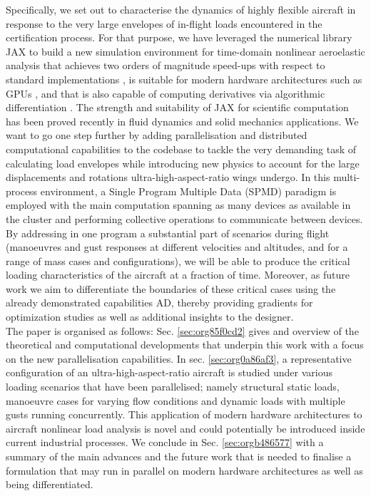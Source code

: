 \documentclass[11pt]{article}
\begin{document}
Specifically, we set out to characterise the dynamics of highly flexible aircraft in response to the very large envelopes of in-flight loads encountered in the certification process. 
For that purpose, we have leveraged the numerical library JAX \cite{jax2018github} to build a new simulation environment for time-domain nonlinear aeroelastic analysis that achieves two orders of magnitude speed-ups with respect to standard implementations \cite{CEA2024},  is suitable for modern hardware architectures such as GPUs \cite{ALVAROCEA2024}, and that is also capable of computing derivatives via algorithmic differentiation \cite{ALVAROCEA2024a}. The strength and suitability of JAX for scientific computation has been proved recently in fluid dynamics \cite{BEZGIN2023} and solid mechanics \cite{XUE2023} applications. 
We want to go one step further by adding parallelisation and distributed computational capabilities to the codebase to tackle the very demanding task of calculating load envelopes while introducing new physics to account for the large displacements and rotations ultra-high-aspect-ratio wings undergo. 
In this multi-process environment, a Single Program Multiple Data (SPMD) paradigm is employed with the main computation spanning as many devices as available in the cluster and performing collective operations to communicate between devices. 
By addressing in one program a substantial part of scenarios during flight (manoeuvres and gust responses at different velocities and altitudes, and for a range of mass cases and configurations), we will be able to produce the critical loading characteristics of the aircraft at a fraction of time. Moreover, as future work we aim to differentiate the boundaries of these critical cases  using the already demonstrated capabilities AD, thereby providing gradients for optimization studies as well as additional insights to the designer.  
\\[0pt]
The paper is organised as follows: Sec. \ref{sec:org85f0cd2} gives and overview of the theoretical and computational developments that underpin this work with a focus on the new parallelisation capabilities. In sec. \ref{sec:org0a86af3}, a representative configuration of an ultra-high-aspect-ratio aircraft is studied under various loading scenarios that have been parallelised; namely structural static loads, manoeuvre cases for varying flow conditions and dynamic loads with multiple gusts running concurrently. This application of modern hardware architectures to aircraft nonlinear load analysis is novel and could potentially be introduced inside current industrial processes. We conclude in Sec. \ref{sec:orgb486577} with a summary of the main advances and the future work that is needed to finalise a formulation that may run in parallel on modern hardware architectures as well as being differentiated.  
\end{document}
